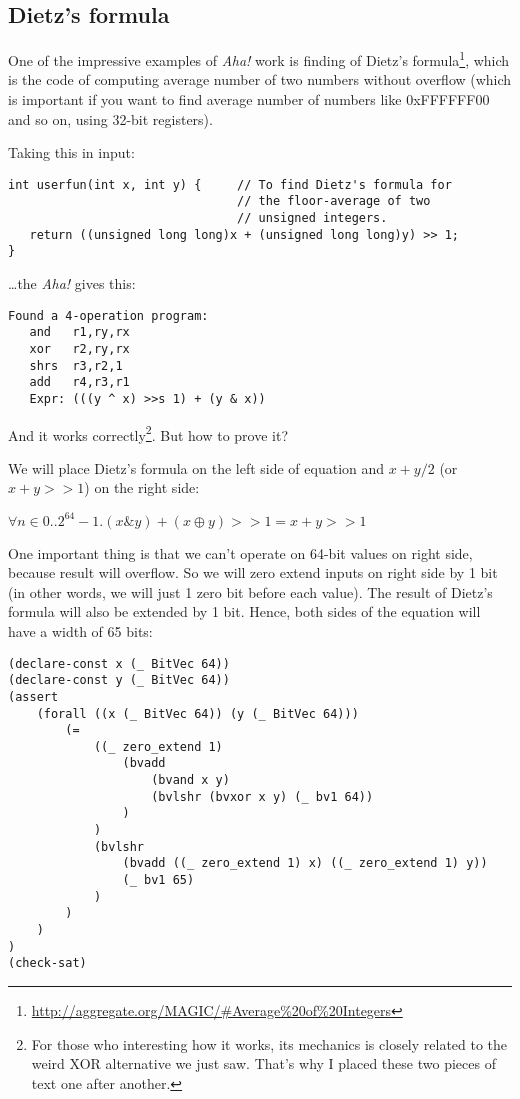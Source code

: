 \subsection{Dietz's formula}

One of the impressive examples of \textit{Aha!} work is finding of Dietz's formula\footnote{\url{http://aggregate.org/MAGIC/\#Average\%20of\%20Integers}},
which is the code of computing average number of two numbers without overflow (which is important if you want to find average number of numbers like 0xFFFFFF00 and so on, using 32-bit registers).

Taking this in input:

\begin{lstlisting}
int userfun(int x, int y) {     // To find Dietz's formula for
                                // the floor-average of two
                                // unsigned integers.
   return ((unsigned long long)x + (unsigned long long)y) >> 1;
}
\end{lstlisting}

\dots the \textit{Aha!} gives this:

\begin{lstlisting}
Found a 4-operation program:
   and   r1,ry,rx
   xor   r2,ry,rx
   shrs  r3,r2,1
   add   r4,r3,r1
   Expr: (((y ^ x) >>s 1) + (y & x))
\end{lstlisting}

And it works correctly\footnote{For those who interesting how it works,
its mechanics is closely related to the weird XOR alternative we just saw.
That's why I placed these two pieces of text one after another.}.
But how to prove it?

We will place Dietz's formula on the left side of equation and $x+y/2$ (or $x+y>>1$) on the right side:

\begin{center}
$\forall n \in 0..2^{64}-1 . (x\&y) + (x \oplus y)>>1 = x+y>>1$
\end{center}

One important thing is that we can't operate on 64-bit values on right side, because result will overflow.
So we will zero extend inputs on right side by 1 bit (in other words, we will just 1 zero bit before each value).
The result of Dietz's formula will also be extended by 1 bit.
Hence, both sides of the equation will have a width of 65 bits:

\begin{lstlisting}
(declare-const x (_ BitVec 64))
(declare-const y (_ BitVec 64))
(assert 
	(forall ((x (_ BitVec 64)) (y (_ BitVec 64)))
		(=
			((_ zero_extend 1)
				(bvadd
					(bvand x y)
					(bvlshr (bvxor x y) (_ bv1 64))
				)
			)
			(bvlshr
				(bvadd ((_ zero_extend 1) x) ((_ zero_extend 1) y))
				(_ bv1 65)
			)
		)
	)
)
(check-sat)
\end{lstlisting}

